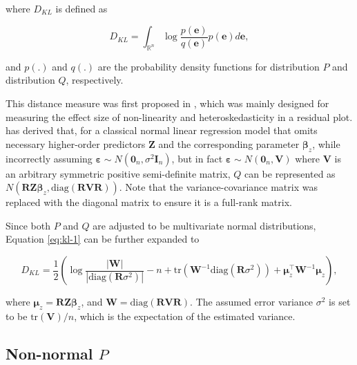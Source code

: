 \documentclass[]{interact}
\theoremstyle{plain}%
\theoremstyle{definition}
\theoremstyle{remark}
\begin{document}
where \(D_{KL}\) is defined as

\begin{equation} \label{eq:kl-1}
D_{KL} = \int_{\mathbb{R}^{n}}\log\frac{p(\boldsymbol{e})}{q(\boldsymbol{e})}p(\boldsymbol{e})d\boldsymbol{e},
\end{equation}

\noindent and \(p(.)\) and \(q(.)\) are the probability density
functions for distribution \(P\) and distribution \(Q\), respectively.

This distance measure was first proposed in \citet{li2024plot}, which
was mainly designed for measuring the effect size of non-linearity and
heteroskedasticity in a residual plot. \citet{li2024plot} has derived
that, for a classical normal linear regression model that omits
necessary higher-order predictors \(\boldsymbol{Z}\) and the
corresponding parameter \(\boldsymbol{\beta}_z\), while incorrectly
assuming
\(\boldsymbol{\varepsilon} \sim N(\boldsymbol{0}_n,\sigma^2\boldsymbol{I}_n)\),
but in fact
\(\boldsymbol{\varepsilon} \sim N(\boldsymbol{0}_n, \boldsymbol{V})\)
where \(\boldsymbol{V}\) is an arbitrary symmetric positive
semi-definite matrix, \(Q\) can be represented as
\(N(\boldsymbol{R}\boldsymbol{Z}\boldsymbol{\beta}_z, \text{diag}(\boldsymbol{R}\boldsymbol{V}\boldsymbol{R}))\).
Note that the variance-covariance matrix was replaced with the diagonal
matrix to ensure it is a full-rank matrix.

Since both \(P\) and \(Q\) are adjusted to be multivariate normal
distributions, Equation \ref{eq:kl-1} can be further expanded to

\begin{equation} \label{eq:kl-2}
D_{KL} = \frac{1}{2}\left(\log\frac{|\boldsymbol{W}|}{|\text{diag}(\boldsymbol{R}\sigma^2)|} - n + \text{tr}(\boldsymbol{W}^{-1}\text{diag}(\boldsymbol{R}\sigma^2)) + \boldsymbol{\mu}_z^\top\boldsymbol{W}^{-1}\boldsymbol{\mu}_z\right),
\end{equation}

\noindent where
\(\boldsymbol{\mu}_z = \boldsymbol{R}\boldsymbol{Z}\boldsymbol{\beta}_z\),
and
\(\boldsymbol{W} = \text{diag}(\boldsymbol{R}\boldsymbol{V}\boldsymbol{R})\).
The assumed error variance \(\sigma^2\) is set to be
\(\text{tr}(\boldsymbol{V})/n\), which is the expectation of the
estimated variance.

\subsection{\texorpdfstring{Non-normal
\(P\)}{Non-normal P}}\label{non-normal-p}
\end{document}
